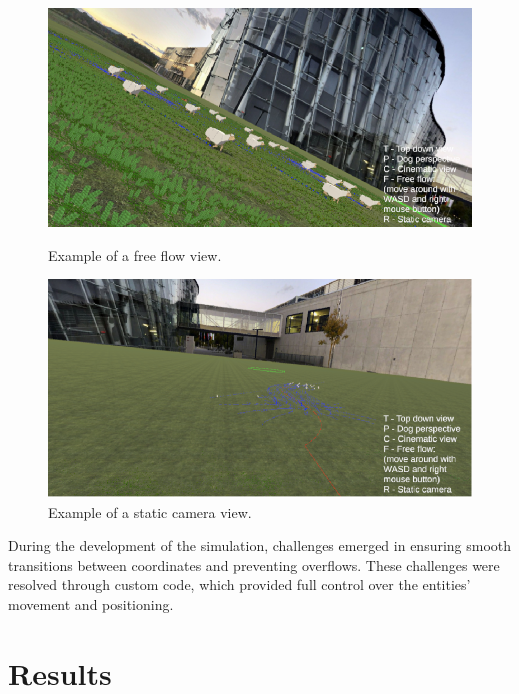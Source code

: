 \documentclass[9pt]{pnas-new}
\begin{document}
\begin{figure}[htbp]
    \vspace{0.4cm}  %

    \begin{minipage}{0.3\textwidth}
        \centering
        \includegraphics[width=\textwidth]{fig/freeflow.PNG}
        \caption{Example of a free flow view.}
    \end{minipage}%
    \hspace{0.02\textwidth}  %
    \begin{minipage}{0.3\textwidth}
        \centering
        \includegraphics[width=\textwidth]{fig/static.PNG}
        \caption{Example of a static camera view.}
    \end{minipage}
\end{figure}

During the development of the simulation, challenges emerged in ensuring smooth transitions between coordinates and preventing overflows. These challenges were resolved through custom code, which provided full control over the entities’ movement and positioning.


\section*{Results}
\end{document}
